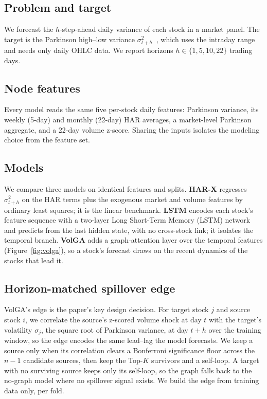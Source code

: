\documentclass{llncs}
\begin{document}
\subsection{Problem and target}
We forecast the $h$-step-ahead daily variance of each stock in a market panel. The target is the Parkinson
high--low variance $\sigma^2_{t+h}$~\cite{parkinson1980}, which uses the intraday range and needs only daily OHLC data. We report
horizons $h \in \{1,5,10,22\}$ trading days.

\subsection{Node features}
Every model reads the same five per-stock daily features: Parkinson variance, its weekly (5-day) and monthly
(22-day) HAR averages, a market-level Parkinson aggregate, and a 22-day volume z-score. Sharing the inputs
isolates the modeling choice from the feature set.

\subsection{Models}
We compare three models on identical features and splits.
\textbf{HAR-X} regresses $\sigma^2_{t+h}$ on the HAR terms plus the exogenous market and volume features by
ordinary least squares; it is the linear benchmark. \textbf{LSTM} encodes each stock's feature sequence with
a two-layer Long Short-Term Memory (LSTM) network and predicts from the last hidden state, with no cross-stock link; it isolates the temporal
branch. \textbf{VolGA} adds a graph-attention layer over the temporal features (Figure~\ref{fig:volga}), so a
stock's forecast draws on the recent dynamics of the stocks that lead it.

\subsection{Horizon-matched spillover edge}
VolGA's edge is the paper's key design decision. For target stock $j$ and source stock $i$, we correlate the
source's z-scored volume shock at day $t$ with the target's volatility $\sigma_j$, the square root of Parkinson
variance, at day $t+h$ over the training window, so the edge encodes the same lead--lag the model forecasts. We keep a source only when its correlation clears a Bonferroni
significance floor across the $n-1$ candidate sources, then keep the Top-$K$ survivors and a self-loop. A
target with no surviving source keeps only its self-loop, so the graph falls back to the no-graph model where
no spillover signal exists. We build the edge from training data only, per fold.
\end{document}
